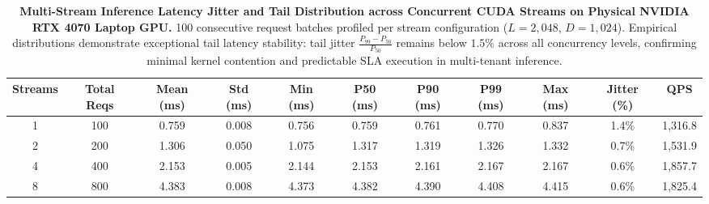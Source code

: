\documentclass[journal]{IEEEtran}
\begin{document}
\begin{table}[t]
\centering
\small
\caption{\textbf{Multi-Stream Inference Latency Jitter and Tail Distribution across Concurrent CUDA Streams on Physical NVIDIA RTX 4070 Laptop GPU.} 100 consecutive request batches profiled per stream configuration ($L=2{,}048$, $D=1{,}024$). Empirical distributions demonstrate exceptional tail latency stability: tail jitter $\frac{P_{99} - P_{50}}{P_{50}}$ remains below $1.5\%$ across all concurrency levels, confirming minimal kernel contention and predictable SLA execution in multi-tenant inference.}
\label{tab:tail_latency_jitter}
\begin{tabular}{ccccccccccc}
\toprule
\textbf{Streams} & \textbf{Total Reqs} & \textbf{Mean (ms)} & \textbf{Std (ms)} & \textbf{Min (ms)} & \textbf{P50 (ms)} & \textbf{P90 (ms)} & \textbf{P99 (ms)} & \textbf{Max (ms)} & \textbf{Jitter (\%)} & \textbf{QPS} \\
\midrule
1 & 100 & 0.759 & 0.008 & 0.756 & 0.759 & 0.761 & 0.770 & 0.837 & 1.4\% & 1,316.8 \\
2 & 200 & 1.306 & 0.050 & 1.075 & 1.317 & 1.319 & 1.326 & 1.332 & 0.7\% & 1,531.9 \\
4 & 400 & 2.153 & 0.005 & 2.144 & 2.153 & 2.161 & 2.167 & 2.167 & 0.6\% & 1,857.7 \\
8 & 800 & 4.383 & 0.008 & 4.373 & 4.382 & 4.390 & 4.408 & 4.415 & 0.6\% & 1,825.4 \\
\bottomrule
\end{tabular}
\end{table}

\end{document}
